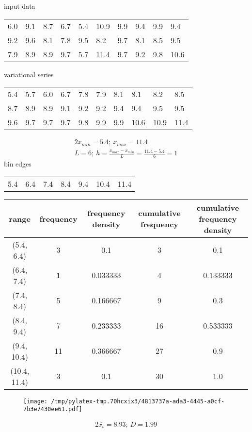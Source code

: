 \documentclass{article}%
\begin{document}
%
\normalsize%
input data%
\begin{longtable}{l l l l l l l l l l }%
6.0&9.1&8.7&6.7&5.4&10.9&9.9&9.4&9.9&9.4\\%
9.2&9.6&8.1&7.8&9.5&8.2&9.7&8.1&8.5&9.5\\%
7.9&8.9&8.9&9.7&5.7&11.4&9.7&9.2&9.8&10.6\\%
\end{longtable}%
variational series%
\begin{longtable}{l l l l l l l l l l }%
5.4&5.7&6.0&6.7&7.8&7.9&8.1&8.1&8.2&8.5\\%
8.7&8.9&8.9&9.1&9.2&9.2&9.4&9.4&9.5&9.5\\%
9.6&9.7&9.7&9.7&9.8&9.9&9.9&10.6&10.9&11.4\\%
\end{longtable}%
\begin{alignat*}{2}%
x_{min} = 5.4; ~ x_{max} = 11.4 \\%
L = 6;
            ~ h = \frac { x_{max} - x_{min} } L
                = \frac { 11.4 - 5.4 } 6
                = 1%
\end{alignat*}%
bin edges%
\begin{longtable}{l l l l l l l }%
5.4&6.4&7.4&8.4&9.4&10.4&11.4\\%
\end{longtable}%
\begin{tabular}{c|c|c|c|c}
\toprule
       range &  frequency & frequency density &  cumulative frequency & cumulative frequency density \\
\midrule
  (5.4, 6.4) &          3 &               0.1 &                     3 &                          0.1 \\
  (6.4, 7.4) &          1 &          0.033333 &                     4 &                     0.133333 \\
  (7.4, 8.4) &          5 &          0.166667 &                     9 &                          0.3 \\
  (8.4, 9.4) &          7 &          0.233333 &                    16 &                     0.533333 \\
 (9.4, 10.4) &         11 &          0.366667 &                    27 &                          0.9 \\
(10.4, 11.4) &          3 &               0.1 &                    30 &                          1.0 \\
\bottomrule
\end{tabular}
%


\begin{figure}[H]%
\centering%
\texttt{[image: /tmp/pylatex-tmp.70hcxix3/4813737a-ada3-4445-a0cf-7b3e7430ee61.pdf]}%
\end{figure}

%
\begin{alignat*}{2}%
\overline { x_{b} } = 8.93%
;~ D = 1.99%
\end{alignat*}%
\end{document}
